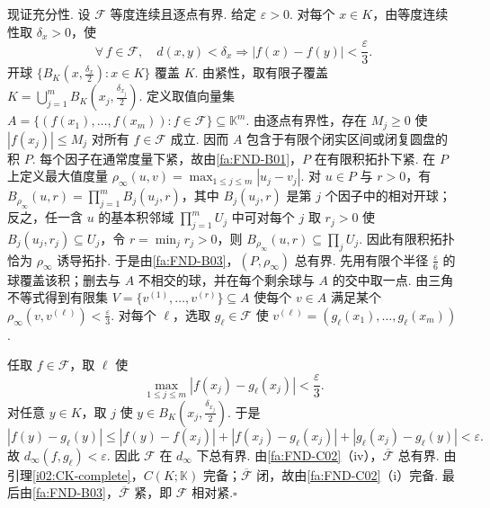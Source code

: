\begin{FAProof}
现证充分性. 设 \(\displaystyle \mathcal F\) 等度连续且逐点有界. 给定 \(\displaystyle \varepsilon>0\). 对每个 \(\displaystyle x\in K\)，由等度连续性取 \(\displaystyle \delta_x>0\)，使
\[
\forall\,f\in\mathcal F,\quad d(x,y)<\delta_x\Longrightarrow |f(x)-f(y)|<\frac{\varepsilon}{3}.
\]
开球 \(\displaystyle \{B_K(x,\frac{\delta_x}{2}):x\in K\}\) 覆盖 \(\displaystyle K\). 由紧性，取有限子覆盖 \(\displaystyle K=\bigcup_{j=1}^{m}B_K(x_j,\frac{\delta_{x_j}}{2})\).
定义取值向量集 \(\displaystyle A=\{(f(x_1),\dots,f(x_m)):f\in\mathcal F\}\subseteq\mathbb K^m\).
由逐点有界性，存在 \(\displaystyle M_j\geqslant0\) 使 \(\displaystyle |f(x_j)|\leqslant M_j\) 对所有 \(\displaystyle f\in\mathcal F\) 成立. 因而 \(\displaystyle A\) 包含于有限个闭实区间或闭复圆盘的积 \(\displaystyle P\). 每个因子在通常度量下紧，故由\autoref{fa:FND-B01}，\(\displaystyle P\) 在有限积拓扑下紧. 在 \(\displaystyle P\) 上定义最大值度量 \(\displaystyle \rho_\infty(u,v)=\max_{1\leqslant j\leqslant m}|u_j-v_j|\).
对 \(\displaystyle u\in P\) 与 \(\displaystyle r>0\)，有 \(\displaystyle B_{\rho_\infty}(u,r)=\prod_{j=1}^{m}B_j(u_j,r)\)，其中 \(\displaystyle B_j(u_j,r)\) 是第 \(\displaystyle j\) 个因子中的相对开球；反之，任一含 \(\displaystyle u\) 的基本积邻域 \(\displaystyle \prod_{j=1}^{m}U_j\) 中可对每个 \(\displaystyle j\) 取 \(\displaystyle r_j>0\) 使 \(\displaystyle B_j(u_j,r_j)\subseteq U_j\)，令 \(\displaystyle r=\min_j r_j>0\)，则 \(\displaystyle B_{\rho_\infty}(u,r)\subseteq\prod_jU_j\). 因此有限积拓扑恰为 \(\displaystyle \rho_\infty\) 诱导拓扑. 于是由\autoref{fa:FND-B03}，\(\displaystyle (P,\rho_\infty)\) 总有界. 先用有限个半径 \(\displaystyle \frac{\varepsilon}{6}\) 的球覆盖该积；删去与 \(\displaystyle A\) 不相交的球，并在每个剩余球与 \(\displaystyle A\) 的交中取一点. 由三角不等式得到有限集 \(\displaystyle V=\{v^{(1)},\dots,v^{(r)}\}\subseteq A\)
使每个 \(\displaystyle v\in A\) 满足某个 \(\displaystyle \rho_\infty(v,v^{(\ell)})<\frac{\varepsilon}{3}\). 对每个 \(\displaystyle \ell\)，选取 \(\displaystyle g_\ell\in\mathcal F\) 使 \(\displaystyle v^{(\ell)}=(g_\ell(x_1),\dots,g_\ell(x_m))\).

任取 \(\displaystyle f\in\mathcal F\)，取 \(\displaystyle \ell\) 使
\[
\max_{1\leqslant j\leqslant m}|f(x_j)-g_\ell(x_j)|<\frac{\varepsilon}{3}.
\]
对任意 \(\displaystyle y\in K\)，取 \(\displaystyle j\) 使 \(\displaystyle y\in B_K(x_j,\frac{\delta_{x_j}}{2})\). 于是
\[
|f(y)-g_\ell(y)|
\leqslant |f(y)-f(x_j)|+|f(x_j)-g_\ell(x_j)|+|g_\ell(x_j)-g_\ell(y)|<\varepsilon.
\]
故 \(\displaystyle d_\infty(f,g_\ell)<\varepsilon\). 因此 \(\displaystyle \mathcal F\) 在 \(\displaystyle d_\infty\) 下总有界. 由\autoref{fa:FND-C02}（iv），\(\displaystyle \overline{\mathcal F}\) 总有界. 由引理\ref{i02:CK-complete}，\(\displaystyle C(K;\mathbb K)\) 完备；\(\displaystyle \overline{\mathcal F}\) 闭，故由\autoref{fa:FND-C02}（i）完备. 最后由\autoref{fa:FND-B03}，\(\displaystyle \overline{\mathcal F}\) 紧，即 \(\displaystyle \mathcal F\) 相对紧.\hfill\(\square\)
\end{FAProof}

